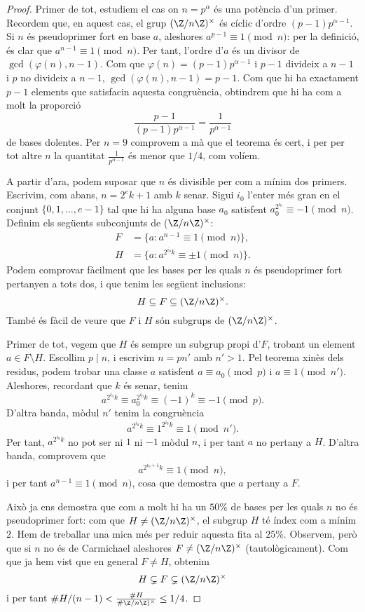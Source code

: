  \begin{proof}
 Primer de tot, estudiem el cas on $n=p^\alpha$ és una potència d'un primer. Recordem que, en aquest cas, el grup $(\Z/n\Z)^\times$ és cíclic d'ordre $(p-1)p^{\alpha-1}$. Si $n$ és pseudoprimer fort en base $a$, aleshores $a^{p-1}\equiv 1\pmod n$: per la definició, és clar que $a^{n-1}\equiv 1\pmod n$. Per tant, l'ordre d'$a$ és un divisor de $\gcd(\varphi(n),n-1)$. Com que $\varphi(n)=(p-1)p^{\alpha-1}$ i $p-1$ divideix a $n-1$ i $p$ no divideix a $n-1$, $\gcd(\varphi(n),n-1)=p-1$. Com que hi ha exactament $p-1$ elements que satisfacin aquesta congruència, obtindrem que hi ha com a molt la proporció
\[
\frac{p-1}{(p-1)p^{\alpha-1}} = \frac{1}{p^{\alpha-1}}
\]
de bases dolentes. Per $n=9$ comprovem a mà que el teorema és cert, i per per tot altre $n$ la quantitat $\frac{1}{p^{\alpha-1}}$ és menor que $1/4$, com volíem.
 
A partir d'ara, podem suposar que $n$ és divisible per com a mínim dos primers. Escrivim, com abans, $n=2^ek+1$ amb $k$ senar. Sigui $i_0$ l'enter més gran en el conjunt $\{0,1,\ldots,e-1\}$ tal que hi ha alguna base $a_0$ satisfent $a_0^{2^{i_0}}\equiv -1\pmod n$. Definim els següents subconjunts de ($\Z/n\Z)^\times$:
\begin{align*}
    F &= \{ a \colon a^{n-1}\equiv 1 \pmod{n}\},\\
    H &= \{ a \colon a^{2^{i_0} k}\equiv \pm 1 \pmod{n}\}.
\end{align*}
Podem comprovar fàcilment que les bases per les quals $n$ és pseudoprimer fort pertanyen a tots dos, i que tenim les següent inclusions:
 \[
 H \subseteq F \subseteq (\Z/n\Z)^\times.
 \]
 També és fàcil de veure que $F$ i $H$ són subgrups de $(\Z/n\Z)^\times$.
 
 Primer de tot, vegem que $H$ és sempre un subgrup propi d'$F$, trobant un element $a \in F\setminus H$. Escollim  $p\mid n$, i escrivim $n=p n'$ amb $n'>1$. Pel teorema xinès dels residus, podem trobar una classe $a$ satisfent $a\equiv a_0\pmod {p}$ i $a\equiv 1\pmod {n'}$. Aleshores, recordant que $k$ és senar, tenim
 \[
 a^{2^{i_0}k}\equiv a_0^{2^{i_0}k}\equiv (-1)^k\equiv -1\pmod {p}.
 \]
D'altra banda, mòdul $n'$ tenim la congruència
\[
a^{2^{i_0}k}\equiv 1^{2^{i_0}k}\equiv 1\pmod {n'}.
\]
Per tant, $a^{2^{i_0}k}$ no pot ser ni $1$ ni $-1$ mòdul $n$, i per tant $a$ no pertany a $H$. D'altra banda, comprovem que
\[
a^{2^{i_0+1}k}\equiv 1\pmod n,
\]
i per tant $a^{n-1}\equiv 1\pmod n$, cosa que demostra que $a$ pertany a $F$.

Això ja ens demostra que com a molt hi ha un $50\%$ de bases per les quals $n$ no és pseudoprimer fort: com que $H\neq (\Z/n\Z)^\times$, el subgrup $H$ té índex com a mínim $2$. Hem de treballar una mica més per reduir aquesta fita al $25\%$. Observem, però que si $n$ no és de Carmichael aleshores $F\neq (\Z/n\Z)^\times$ (tautològicament). Com que ja hem vist que en general $F\neq H$, obtenim
\[
H\subsetneq F\subsetneq (\Z/n\Z)^\times
\]
i per tant $\#H/(n-1)<\frac{\#H}{\#\Z/n\Z)^\times}\leq 1/4$.


\end{proof}
